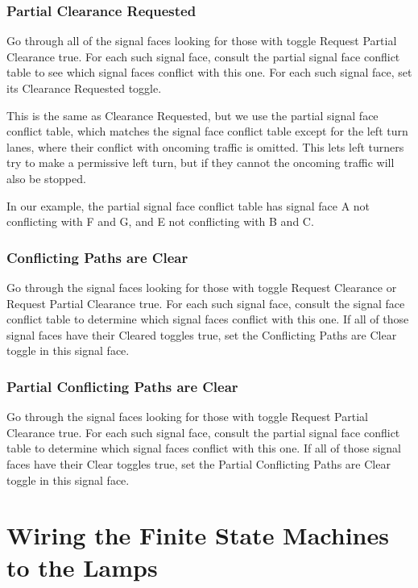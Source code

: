 \documentclass[letterpaper,twoside]{article}
\begin{document}
\subsubsection{Partial Clearance Requested}

Go through all of the signal faces looking for those with toggle
Request Partial Clearance true.  For each such signal face, consult the
partial signal face conflict table to see which signal faces conflict
with this one.
For each such signal face, set its Clearance Requested toggle.

This is the same as Clearance Requested, but we use the partial signal face
conflict table, which matches the signal face conflict table except
for the left turn lanes, where their conflict with oncoming traffic is
omitted.
This lets left turners try to make a
permissive left turn, but if they cannot the oncoming traffic will also
be stopped.

In our example, the partial signal face conflict table
has signal face A not conflicting with F and G, and E not
conflicting with B and C.  

\subsubsection{Conflicting Paths are Clear}

Go through the signal faces looking for those with toggle Request Clearance
or Request Partial Clearance
true.  For each such signal face, consult the signal face conflict table
to determine which signal faces conflict with this one.  If all of those
signal faces have their Cleared toggles true, set the Conflicting Paths
are Clear toggle in this signal face.

\subsubsection{Partial Conflicting Paths are Clear}

Go through the signal faces looking for those with toggle Request Partial
Clearance true.  For each such signal face, consult the partial
signal face conflict table to determine which signal faces conflict
with this one.  If all of those signal faces have their Clear toggles
true, set the Partial Conflicting Paths are Clear toggle in this
signal face.

\section{Wiring the Finite State Machines to the Lamps}
\end{document}
